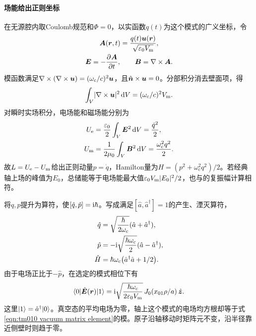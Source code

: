 \paragraph{场能给出正则坐标}
在无源腔内取Coulomb规范和$\Phi = 0$，以实函数$q(t)$为这个模式的广义坐标，令
\begin{gather*}
    \bm A(\bm r,t) = \frac{q(t)\bm u(\bm r)}{\sqrt{\varepsilon_0 V_{\mathrm m}}},\\
    \bm E = -\frac{\partial^{}\bm A}{\partial{t}^{}},\qquad \bm B = \nabla\times\bm A .
\end{gather*}
模函数满足$\nabla\times(\nabla\times\bm u) = (\omega_{\mathrm{c}}/c)^2\bm u$，且$\mathop{}\!\hat{\bm{n}} \times \bm u = 0$。分部积分消去壁面项，得
\[
    \int_V\lvert\nabla\times\bm u\rvert^2\mathop{}\!\mathrm{d} V = (\omega_{\mathrm{c}}/c)^2 V_{\mathrm m}.
\]
对瞬时实场积分，电场能和磁场能分别为
\begin{subequations}
    \label{eq:ed-cavity-canonical-energies}
    \begin{align}
        U_{\mathrm e} &= \frac{\varepsilon_0}{2}\int_V\bm E^2\mathop{}\!\mathrm{d} V = \frac{\dot q^2}{2},\\
        U_{\mathrm m} &= \frac{1}{2\mu_0}\int_V\bm B^2\mathop{}\!\mathrm{d} V = \frac{\omega_{\mathrm{c}}^2q^2}{2}.
    \end{align}
\end{subequations}
故$L = U_\mathrm e - U_\mathrm m$给出正则动量$p = \dot q$，Hamilton量为$H = (p^2 + \omega_{\mathrm{c}}^2q^2)/2$。若经典轴上场的峰值为$E_0$，总储能等于电场能最大值$\varepsilon_0 V_{\mathrm m}\lvert E_0\rvert^2/2$，也与的复振幅计算相符。

将$q,p$提升为算符，使$[\hat q,\hat p] = \mathrm{i}\hbar$。写成满足$[\hat a,\hat a^\dagger] = 1$的产生、湮灭算符，
\begin{subequations}
    \label{eq:ed-mode-quantization}
    \begin{align}
        \hat q &= \sqrt{\frac{\hbar}{2\omega_{\mathrm{c}}}}(\hat a + \hat a^\dagger),\\
        \hat p &= -\mathrm{i}\sqrt{\frac{\hbar\omega_{\mathrm{c}}}{2}}(\hat a - \hat a^\dagger),\\
        \hat H &= \hbar\omega_{\mathrm{c}}\bigl(\hat a^\dagger\hat a + 1/2\bigr).
    \end{align}
\end{subequations}
由于电场正比于$-\hat p$，在选定的模式相位下有
\begin{equation}
    \langle0\vert\hat{\bm E}(\bm r)\vert1\rangle
      = \mathrm{i}\sqrt{\frac{\hbar\omega_{\mathrm{c}}}{2\varepsilon_0 V_{\mathrm m}}}\,
       J_0(x_{01}\rho/a)\mathop{}\!\hat{\bm{z}} .
    \label{eqn:tm010 vacuum matrix element}
\end{equation}
这里$\lvert1\rangle = \hat a^\dagger\lvert0\rangle$。真空态的平均电场为零，轴上这个模式的电场均方根却等于式\eqref{eqn:tm010 vacuum matrix element}的模。原子沿轴移动时矩阵元不变，沿半径靠近侧壁时则趋于零。

